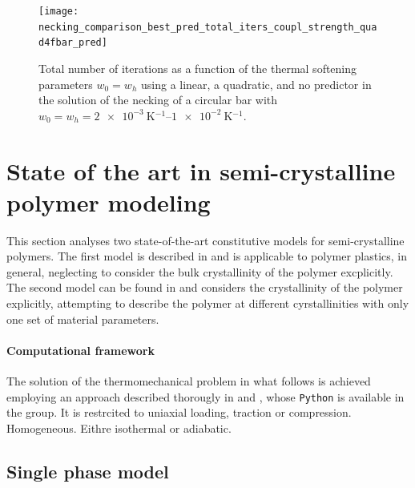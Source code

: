      \begin{figure}[!hbtp]
       \centering
       \texttt{[image: necking\_comparison\_best\_pred\_total\_iters\_coupl\_strength\_quad4fbar\_pred]}
       \caption{Total number of iterations as a function of the thermal softening parameters \(w_0=w_h\) using a linear, a quadratic, and no predictor in the solution of the necking of a circular bar with \(w_0=w_h=\SIrange{2e-3}{1e-2}{\kelvin^{-1}}\).}
       \label{fig:necking_comparison_best_pred_total_iters_coupl_strength_quad4fbar_pred}
     \end{figure}

\section{State of the art in semi-crystalline polymer modeling}

This section analyses two state-of-the-art constitutive models for semi-crystalline polymers.
The first model is described in \cite{hao} and is applicable to polymer plastics, in general, neglecting to consider the bulk crystallinity of the polymer excplicitly.
The second model can be found in \cite{hameed} and considers the crystallinity of the polymer explicitly, attempting to describe the polymer at different cyrstallinities with only one set of material parameters.

\paragraph{Computational framework}
The solution of the thermomechanical problem in what follows is achieved employing an approach described thorougly in \cite{berg} and \cite{alves}, whose \verb|Python| is available in the group.
It is restrcited to uniaxial loading, traction or compression.
Homogeneous.
Eithre isothermal or adiabatic.

\subsection{Single phase model}

